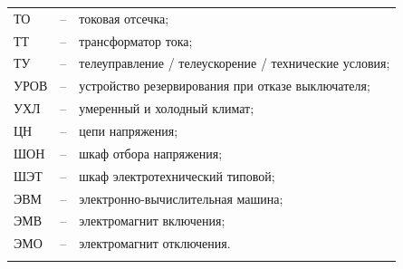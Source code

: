 \begin{longtable}{>{\raggedright\arraybackslash}m{2cm}>{\raggedright\arraybackslash}m{0.5cm}>{\raggedright\arraybackslash}m{20cm}}
ТО & -- & токовая отсечка; \\
ТТ & -- & трансформатор тока; \\
ТУ & -- & телеуправление / телеускорение / технические условия; \\
УРОВ & -- & устройство резервирования при отказе выключателя; \\
УХЛ & -- & умеренный и холодный климат; \\
ЦН & -- & цепи напряжения; \\
ШОН & -- & шкаф отбора напряжения; \\
ШЭТ & -- & шкаф электротехнический типовой; \\
ЭВМ & -- & электронно-вычислительная машина; \\
ЭМВ & -- & электромагнит включения; \\
ЭМО & -- & электромагнит отключения. \\
{\color{white}\fontsize{0.1pt}{0.1pt}\selectfont<endABBRS>}
\end{longtable}
